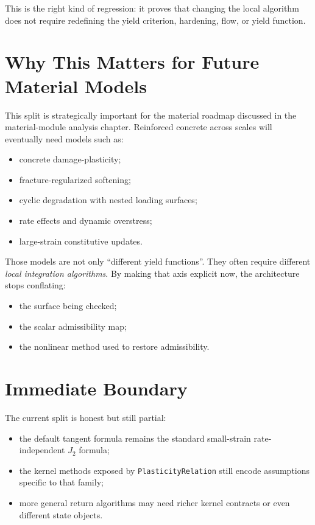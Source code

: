 This is the right kind of regression: it proves that changing the local
algorithm does not require redefining the yield criterion, hardening, flow, or
yield function.

\section{Why This Matters for Future Material Models}

This split is strategically important for the material roadmap discussed in the
material-module analysis chapter.  Reinforced concrete across scales will
eventually need models such as:

\begin{itemize}
  \item concrete damage-plasticity;
  \item fracture-regularized softening;
  \item cyclic degradation with nested loading surfaces;
  \item rate effects and dynamic overstress;
  \item large-strain constitutive updates.
\end{itemize}

Those models are not only ``different yield functions''.  They often require
different \emph{local integration algorithms}.  By making that axis explicit
now, the architecture stops conflating:

\begin{itemize}
  \item the surface being checked;
  \item the scalar admissibility map;
  \item the nonlinear method used to restore admissibility.
\end{itemize}

\section{Immediate Boundary}

The current split is honest but still partial:

\begin{itemize}
  \item the default tangent formula remains the standard small-strain
        rate-independent \(J_2\) formula;
  \item the kernel methods exposed by \texttt{PlasticityRelation} still encode
        assumptions specific to that family;
  \item more general return algorithms may need richer kernel contracts or even
        different state objects.
\end{itemize}

